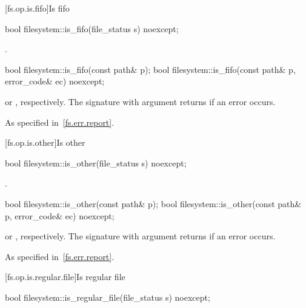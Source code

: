 [fs.op.is.fifo]{Is fifo}

%
\begin{itemdecl}
bool filesystem::is_fifo(file_status s) noexcept;
\end{itemdecl}

\begin{itemdescr}
\pnum
\returns
{}.
\end{itemdescr}


%
\begin{itemdecl}
bool filesystem::is_fifo(const path& p);
bool filesystem::is_fifo(const path& p, error_code& ec) noexcept;
\end{itemdecl}

\begin{itemdescr}
\pnum
\returns
{} or , respectively.
The signature with argument  returns  if an error occurs.

\pnum
\throws
As specified in~\ref{fs.err.report}.
\end{itemdescr}


[fs.op.is.other]{Is other}

%
\begin{itemdecl}
bool filesystem::is_other(file_status s) noexcept;
\end{itemdecl}

\begin{itemdescr}
\pnum
\returns
{}.
\end{itemdescr}

%
\begin{itemdecl}
bool filesystem::is_other(const path& p);
bool filesystem::is_other(const path& p, error_code& ec) noexcept;
\end{itemdecl}

\begin{itemdescr}
\pnum
\returns
{} or ,
  respectively. The signature with argument  returns 
  if an error occurs.

\pnum
\throws
As specified in~\ref{fs.err.report}.
\end{itemdescr}


[fs.op.is.regular.file]{Is regular file}

%
\begin{itemdecl}
bool filesystem::is_regular_file(file_status s) noexcept;
\end{itemdecl}

